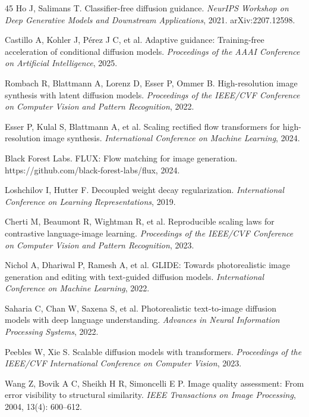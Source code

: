 \documentclass[times,twocolumn,final]{elsarticle}
\begin{document}
\begin{thebibliography}{45}
Ho J, Salimans T. Classifier-free diffusion guidance. \textit{NeurIPS Workshop on Deep Generative Models and Downstream Applications}, 2021. arXiv:2207.12598.

Castillo A, Kohler J, P\'erez J C, et al. Adaptive guidance: Training-free acceleration of conditional diffusion models. \textit{Proceedings of the AAAI Conference on Artificial Intelligence}, 2025.

Rombach R, Blattmann A, Lorenz D, Esser P, Ommer B. High-resolution image synthesis with latent diffusion models. \textit{Proceedings of the IEEE/CVF Conference on Computer Vision and Pattern Recognition}, 2022.

Esser P, Kulal S, Blattmann A, et al. Scaling rectified flow transformers for high-resolution image synthesis. \textit{International Conference on Machine Learning}, 2024.

Black Forest Labs. FLUX: Flow matching for image generation. https://github.com/black-forest-labs/flux, 2024.

Loshchilov I, Hutter F. Decoupled weight decay regularization. \textit{International Conference on Learning Representations}, 2019.

Cherti M, Beaumont R, Wightman R, et al. Reproducible scaling laws for contrastive language-image learning. \textit{Proceedings of the IEEE/CVF Conference on Computer Vision and Pattern Recognition}, 2023.

Nichol A, Dhariwal P, Ramesh A, et al. GLIDE: Towards photorealistic image generation and editing with text-guided diffusion models. \textit{International Conference on Machine Learning}, 2022.

Saharia C, Chan W, Saxena S, et al. Photorealistic text-to-image diffusion models with deep language understanding. \textit{Advances in Neural Information Processing Systems}, 2022.

Peebles W, Xie S. Scalable diffusion models with transformers. \textit{Proceedings of the IEEE/CVF International Conference on Computer Vision}, 2023.

Wang Z, Bovik A C, Sheikh H R, Simoncelli E P. Image quality assessment: From error visibility to structural similarity. \textit{IEEE Transactions on Image Processing}, 2004, 13(4): 600--612.


\end{thebibliography}
\end{document}
